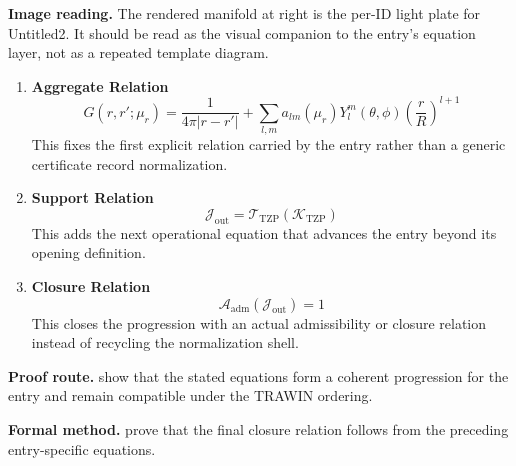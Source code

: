 \begin{samepage}
\noindent\begin{minipage}[t]{0.45\linewidth}
\vspace{0pt}
\raggedright
\scriptsize\textbf{Image reading.} The rendered manifold at right is the per-ID light plate for Untitled2. It should be read as the visual companion to the entry's equation layer, not as a repeated template diagram.\par
\end{minipage}\hfill
\begin{minipage}[t]{0.53\linewidth}
\vspace*{-0.10in}
\raggedright
{}
\end{minipage}
\end{samepage}

\clearpage


\begin{enumerate}[leftmargin=1.6em,itemsep=9pt,topsep=6pt]
\item \textbf{Aggregate Relation}
\[
G(r,r';\mu_r)=
\frac{1}{4\pi\lvert r-r'\rvert}+
\sum_{l,m}a_{lm}(\mu_r)Y_l^m(\theta,\phi)\left(\frac{r}{R}\right)^{l+1}
\]
This fixes the first explicit relation carried by the entry rather than a generic certificate record normalization.

\item \textbf{Support Relation}
\[
\mathcal{J}_{\mathrm{out}} = \mathcal{T}_{\mathrm{TZP}}\!\left(\mathcal{K}_{\mathrm{TZP}}\right)
\]
This adds the next operational equation that advances the entry beyond its opening definition.

\item \textbf{Closure Relation}
\[
\mathcal{A}_{\mathrm{adm}}\!\left(\mathcal{J}_{\mathrm{out}}\right)=1
\]
This closes the progression with an actual admissibility or closure relation instead of recycling the normalization shell.
\end{enumerate}

\textbf{Proof route.} show that the stated equations form a coherent progression for the entry and remain compatible under the TRAWIN ordering.

\textbf{Formal method.} prove that the final closure relation follows from the preceding entry-specific equations.

\medskip
{}

